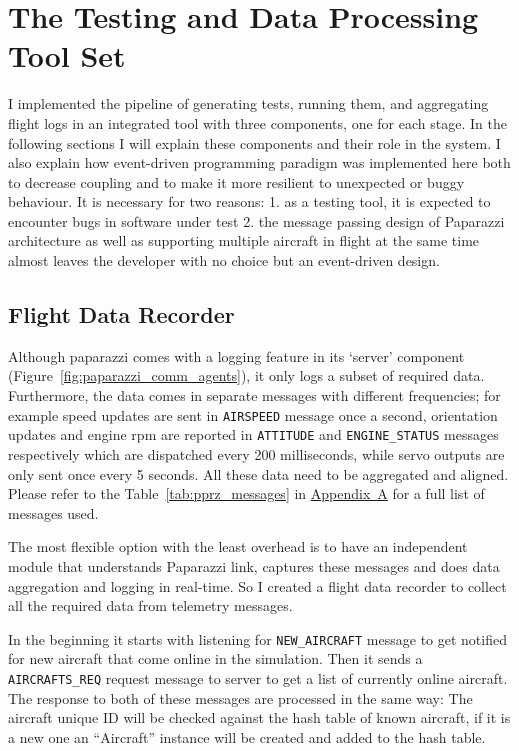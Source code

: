 \section{The Testing and Data Processing Tool Set}
I implemented the pipeline of generating tests, running them, and aggregating flight logs in an integrated tool with three components, one for each stage. In the following sections I will explain these components and their role in the system. I also explain how event-driven programming paradigm was implemented here both to decrease coupling and to make it more resilient to unexpected or buggy behaviour. It is necessary for two reasons: 1. as a testing tool, it is expected to encounter bugs in software under test 2. the message passing design of Paparazzi architecture as well as supporting multiple aircraft in flight at the same time almost leaves the developer with no choice but an event-driven design.


\subsection{Flight Data Recorder}
Although paparazzi comes with a logging feature in its `server' component (Figure~\ref{fig:paparazzi_comm_agents}), it only logs a subset of required data. Furthermore, the data comes in separate messages with different frequencies; for example speed updates are sent in \verb|AIRSPEED| message once a second, orientation updates and engine rpm are reported in \verb|ATTITUDE| and \verb|ENGINE_STATUS| messages respectively which are dispatched every 200 milliseconds, while servo outputs are only sent once every 5 seconds. All these data need to be aggregated and aligned. Please refer to the Table~\ref{tab:pprz_messages} in \hyperref[appendixa]{Appendix~A} for a full list of messages used.

The most flexible option with the least overhead is to have an independent module that understands Paparazzi link, captures these messages and does data aggregation and logging in real-time. So I created a flight data recorder to collect all the required data from telemetry messages.

In the beginning it starts with listening for \verb|NEW_AIRCRAFT| message to get notified for new aircraft that come online in the simulation. Then it sends a \verb|AIRCRAFTS_REQ| request message to server to get a list of currently online aircraft. The response to both of these messages are processed in the same way: The aircraft unique ID will be checked against the hash table of known aircraft, if it is a new one an ``Aircraft'' instance will be created and added to the hash table. 

